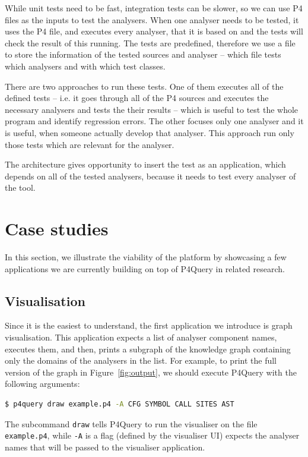 \documentclass[sigconf]{acmart}
\begin{document}
	While unit tests need to be fast, integration tests can be slower, so we can use P4 files as the inputs to test the analysers. When one analyser needs to be tested, it uses the P4 file, and executes every analyser, that it is based on and the tests will check the result of this running. The tests are predefined, therefore we use a file to store the information of the tested sources and analyser -- which file tests which analysers and with which test classes.
	
	There are two approaches to run these tests. One of them executes all of the defined tests -- i.e. it goes through all of the P4 sources and executes the necessary analysers and tests the their results -- which is useful to test the whole program and identify regression errors. The other focuses only one analyser and it is useful, when someone actually develop that analyser. This approach run only those tests which are relevant for the analyser.
	
	The architecture gives opportunity to insert the test as an application, which depends on all of the tested analysers, because it needs to test every analyser of the tool. 
	
  \section{Case studies}\label{sec:apps} %
	
	

  In this section, we illustrate the viability of the platform by showcasing a few applications we are currently building on top of P4Query in related research. 

	\subsection{Visualisation} %
  
  Since it is the easiest to understand, the first application we introduce is graph visualisation. This application expects a list of analyser component names, executes them, and then, prints a subgraph of the knowledge graph containing only the domains of the analysers in the list. For example, to print the full version of the graph in Figure~\ref{fig:output}, we should execute P4Query with the following arguments:
  \begin{lstlisting}[language=bash, basicstyle=\footnotesize]
$ p4query draw example.p4 -A CFG SYMBOL CALL SITES AST 
\end{lstlisting}
The subcommand \texttt{draw} tells P4Query to run the visualiser on the file \texttt{example.p4}, while \texttt{-A} is a flag (defined by the visualiser UI) expects the analyser names that will be passed to the visualiser application. 
\end{document}
